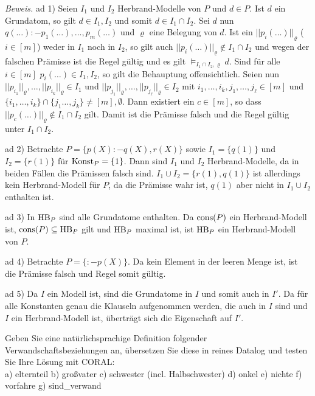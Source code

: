 \documentclass[12pt,a4paper]{amsart}
\begin{document}
{\em Beweis.}
ad 1) Seien $I_1$ und $I_2$ Herbrand-Modelle von $P$ und $d\in P$. Ist $d$ ein Grundatom, so gilt $d\in I_1,I_2$ und somit $d\in I_1\cap I_2$. Sei $d$ nun $q(\dots):-
p_1(\dots),\dots,p_m(\dots)$ und $\varrho$ eine Belegung von $d$. Ist ein $||p_i(\dots)||_{\varrho}$ ($i\in[m]$) weder in $I_1$ noch in $I_2$, so gilt auch 
$||p_i(\dots)||_{\varrho}\not\in I_1\cap I_2$ und wegen der falschen Prämisse ist die Regel gültig und es gilt $\models_{I_1\cap I_2,\varrho}d$. Sind für alle $i\in[m]$ $p_i(\dots)\in I_1,I_2$, so gilt die Behauptung offensichtlich. Seien nun $||p_{i_1}||_{\varrho},\dots,||p_{i_k}||_{\varrho}\in I_1$ und $||p_{j_1}||_{\varrho},\dots,||p_{j_{\ell}}||_{\varrho}\in I_2$ mit $i_1,\dots,i_k,j_1,\dots,j_{\ell}\in[m]$ und $\{i_1,\dots,i_k\}\cap\{j_1\dots,j_k\}\neq[m],\emptyset$. Dann existiert ein $c\in[m]$,
so dass $||p_c(\dots)||_{\varrho}\not\in I_1\cap I_2$ gilt. Damit ist die Prämisse falsch und die Regel gültig unter $I_1\cap I_2$.

\medskip

ad 2) Betrachte $P=\{p(X):-q(X),r(X)\}$ sowie $I_1=\{q(1)\}$ und $I_2=\{r(1)\}$ für $\operatorname{Konst}_P=\{1\}$. Dann sind $I_1$ und $I_2$ Herbrand-Modelle, da in beiden Fällen
die Prämissen falsch sind. $I_1\cup I_2=\{r(1),q(1)\}$ ist allerdings kein Herbrand-Modell für $P$, da die Prämisse wahr ist, $q(1)$ aber nicht in $I_1\cup I_2$ enthalten ist.

\medskip

ad 3) In $\operatorname{HB}_P$ sind alle Grundatome enthalten. Da $\operatorname{cons}(P)$ ein Herbrand-Modell ist, $\operatorname{cons}(P)\subseteq\operatorname{HB}_P$ gilt und $\operatorname{HB}_P$ maximal ist, ist $\operatorname{HB}_P$ ein Herbrand-Modell von $P$.

\medskip

ad 4) Betrachte $P=\{:-p(X)\}$. Da kein Element in der leeren Menge ist, ist die Prämisse falsch und Regel somit gültig.

\medskip

ad 5) Da $I$ ein Modell ist, sind die Grundatome in $I$ und somit auch in $I'$. Da für alle Konstanten genau die Klauseln aufgenommen werden, die auch in $I$ sind und
$I$ ein Herbrand-Modell ist, überträgt sich die Eigenschaft auf $I'$.

\begin{aufgabe1}
Geben Sie eine natürlichsprachige Definition folgender Verwandschaftsbeziehungen an, übersetzen Sie diese in reines Datalog und testen Sie Ihre Lösung mit CORAL:\\
a) elternteil
b) großvater
c) schwester (incl. Halbschwester)
d) onkel
e) nichte
f) vorfahre
g) sind\_verwand
\end{aufgabe1}
\end{document}
